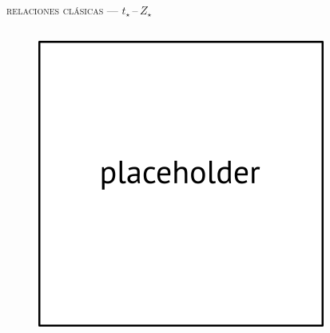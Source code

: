 \documentclass[xcolor=dvipsnames,fleqn,hyperref={colorlinks,citecolor=black,linkcolor=black,urlcolor=black}]{beamer}
\begin{document}
\begin{frame}{\textsc{relaciones clásicas --- $t_\star\,$--$\,Z_\star$}}

\begin{columns}
\begin{figure}
\includegraphics[scale=1]{img/placeholder}
\end{figure}
%



\end{columns}
\end{frame}
\end{document}
